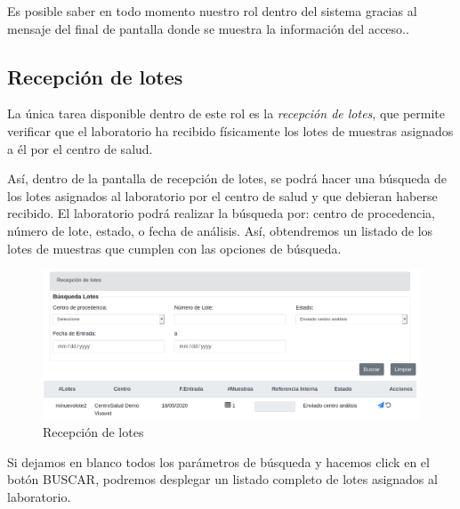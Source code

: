 \documentclass[a4paper,spanish]{paper}
\begin{document}
\medskip
\begin{tcolorbox}[colback=blue!3!white,colframe=blue(ryb)!50!black,title=\textbf{Tip}]

Es posible saber en todo momento nuestro rol dentro del sistema gracias al mensaje del final de pantalla donde se muestra la información del acceso..

\end{tcolorbox}

\subsection{Recepción de lotes}

La única tarea disponible dentro de este rol es la \emph{recepción de lotes}, que permite verificar que el laboratorio ha recibido físicamente los lotes de muestras asignados a él por el centro de salud.

Así, dentro de la pantalla de recepción de lotes, se podrá hacer una búsqueda de los lotes asignados al laboratorio por el centro de salud y que debieran haberse recibido. El laboratorio podrá realizar la búsqueda por: centro de procedencia, número de lote, estado, o fecha de análisis. Así, obtendremos un listado de los lotes de muestras que cumplen con las opciones de búsqueda.

\begin{figure}[h]
\centering
\includegraphics[scale=0.6]{Figs/Fig11.png}
\caption{Recepción de lotes}
\label{Fig11}
\end{figure}

\medskip
\begin{tcolorbox}[colback=blue!3!white,colframe=blue(ryb)!50!black,title=\textbf{Tip}]

Si dejamos en blanco todos los parámetros de búsqueda y hacemos click en el botón BUSCAR, podremos desplegar un listado completo de lotes asignados al laboratorio.

\end{tcolorbox}
\end{document}
